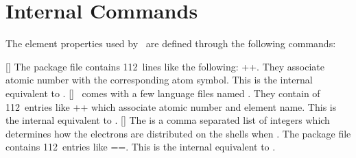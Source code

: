 \documentclass[load-preamble+]{cnltx-doc}
\begin{document}
\section{Internal Commands}\label{sec:internal-commands}
The element properties used by \BOHR\ are defined through the following commands:
\begin{commands}
  []
    The package file contains 112~lines like the following:
    \verbcode++.  They associate atomic number with
    the corresponding atom symbol.  This is the internal equivalent to
    .
  []
    \BOHR\ comes with a few language files named
    .  They contain of 112~entries
    like \verbcode++ which associate atomic number
    and element name.  This is the internal equivalent to .
  []
    The  is a comma separated list of integers
    which determines how the electrons are distributed on the shells when
    .  The package file contains
    112~entries like \verbcode==.
    This is the internal equivalent to .
\end{commands}
\end{document}
